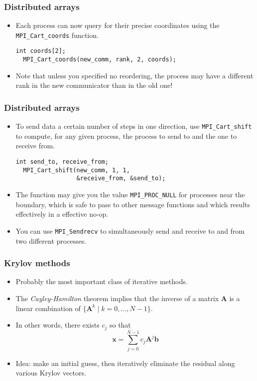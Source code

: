 \begin{frame}[fragile]
  \frametitle{Distributed arrays}
  \begin{itemize}
  \item Each process can now query for their precise coordinates using the
    \texttt{MPI\_Cart\_coords} function.
\begin{lstlisting}[style=c]
  int coords[2];
  MPI_Cart_coords(new_comm, rank, 2, coords);
\end{lstlisting}
  \item Note that unless you specified no reordering, the process may have a
    different rank in the new communicator than in the old one!
  \end{itemize}
\end{frame}

\begin{frame}[fragile]
  \frametitle{Distributed arrays}
  \begin{itemize}
  \item To send data a certain number of steps in one direction, use
    \texttt{MPI\_Cart\_shift} to compute, for any given process, the process to
    send to and the one to receive from.
\begin{lstlisting}[style=c]
  int send_to, receive_from;
  MPI_Cart_shift(new_comm, 1, 1,
                 &receive_from, &send_to);
\end{lstlisting}
  \item The function may give you the value \texttt{MPI\_PROC\_NULL} for
    processes near the boundary, which is safe to pass to other message
    functions and which results effectively in a effective no-op.
  \item You can use \texttt{MPI\_Sendrecv} to simultaneously send and receive to
    and from two different processes.
  \end{itemize}
\end{frame}

\begin{frame}
  \frametitle{Krylov methods}
  \begin{itemize}
  \item Probably the most important class of iterative methods.
  \item The \emph{Cayley-Hamilton} theorem implies that the inverse of a matrix
    $\bm A$ is a linear combination of $\{\bm A^k \;|\; k = 0,\ldots,N-1 \}$.
  \item In other words, there exists $c_j$ so that
    \[
      \bm x = \sum_{j=0}^{N-1} c_j \bm A^j \bm b
    \]
  \item Idea: make an initial guess, then iteratively eliminate the residual
    along various Krylov vectors.
  \end{itemize}
\end{frame}

